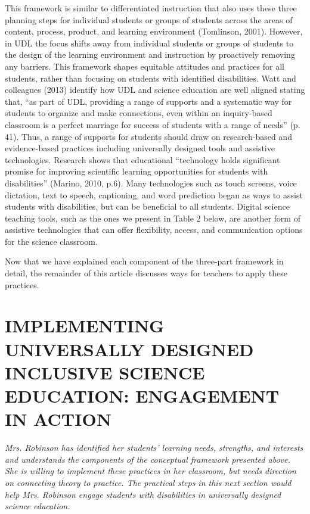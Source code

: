 \documentclass[11.5pt]{sig-alternate}
\begin{document}
\begin{large}
This framework is similar to differentiated instruction that also uses these three planning steps for individual students or groups of students across the areas of content, process, product, and learning environment (Tomlinson, 2001). However, in UDL the focus shifts away from individual students or groups of students to the design of the learning environment and instruction by proactively removing any barriers. This framework shapes equitable attitudes and practices for all students, rather than focusing on students with identified disabilities. Watt and colleagues (2013) identify how UDL and science education are well aligned stating that, “as part of UDL, providing a range of supports and a systematic way for students to organize and make connections, even within an inquiry-based classroom is a perfect marriage for success of students with a range of needs” (p. 41). Thus, a range of supports for students should draw on research-based and evidence-based practices including universally designed tools and assistive technologies. Research shows that educational “technology holds significant promise for improving scientific learning opportunities for students with disabilities” (Marino, 2010, p.6). Many technologies such as touch screens, voice dictation, text to speech, captioning, and word prediction began as ways to assist students with disabilities, but can be beneficial to all students. Digital science teaching tools, such as the ones we present in Table 2 below, are another form of assistive technologies that can offer flexibility, access, and communication options for the science classroom. 

Now that we have explained each component of the three-part framework in detail, the remainder of this article discusses ways for teachers to apply these practices.

\section*{IMPLEMENTING UNIVERSALLY DESIGNED INCLUSIVE SCIENCE EDUCATION: ENGAGEMENT IN ACTION}

\textit{Mrs. Robinson has identified her students’ learning needs, strengths, and interests and understands the components of the conceptual framework presented above. She is willing to implement these practices in her classroom, but needs direction on connecting theory to practice. The practical steps in this next section would help Mrs. Robinson engage students with disabilities in universally designed science education. }


\end{large}
\end{document}
